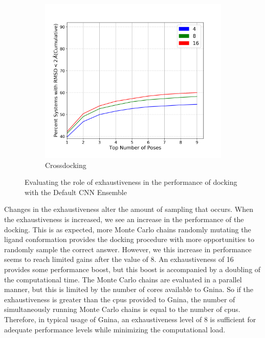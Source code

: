 \documentclass[journal=jcisd8,manuscript=article]{achemso}
\begin{document}
\begin{figure}
\begin{subfigure}[b]{0.48\textwidth}
		\includegraphics[width=\textwidth]{figures/crossdocking/sweep_exhaustiveness_line.png}
		\caption{Crossdocking}
		\label{fig:exhaustiveness cd}
        \end{subfigure}    
	\caption{Evaluating the role of exhaustiveness in the performance of docking with the Default CNN Ensemble}
	\label{fig:exhaustiveness}
\end{figure}    

Changes in the exhaustiveness alter the amount of sampling that occurs. When the exhaustiveness is increased, we see an increase in the performance of the docking. This is as expected, more Monte Carlo chains randomly mutating the ligand conformation provides the docking procedure with more opportunities to randomly sample the correct answer. However, we this increase in performance seems to reach limited gains after the value of 8. An exhaustiveness of 16 provides some performance boost, but this boost is accompanied by a doubling of the computational time. The Monte Carlo chains are evaluated in a parallel manner, but this is limited by the number of cores available to Gnina. So if the exhaustiveness is greater than the cpus provided to Gnina, the number of simultaneously running Monte Carlo chains is equal to the number of cpus. Therefore, in typical usage of Gnina, an exhaustiveness level of 8 is sufficient for adequate performance levels while minimizing the computational load.
\end{document}

